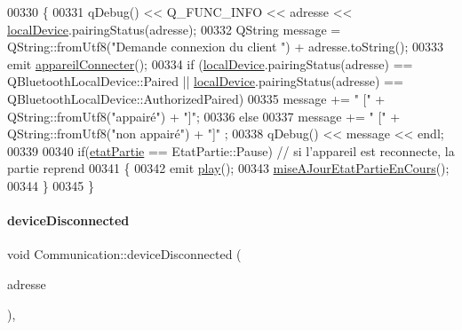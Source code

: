 \begin{DoxyCode}
00330 \{
00331     qDebug() << Q\_FUNC\_INFO << adresse << \hyperlink{class_communication_a6281796eab7523bef6be1a766e0e906f}{localDevice}.pairingStatus(adresse);
00332     QString message = QString::fromUtf8(\textcolor{stringliteral}{"Demande connexion du client "}) + adresse.toString();
00333     emit \hyperlink{class_communication_ae05ddbb1481cfb64f493940b6db8ed29}{appareilConnecter}();
00334     \textcolor{keywordflow}{if} (\hyperlink{class_communication_a6281796eab7523bef6be1a766e0e906f}{localDevice}.pairingStatus(adresse) == QBluetoothLocalDevice::Paired || 
      \hyperlink{class_communication_a6281796eab7523bef6be1a766e0e906f}{localDevice}.pairingStatus(adresse) == QBluetoothLocalDevice::AuthorizedPaired)
00335         message += \textcolor{stringliteral}{" ["} + QString::fromUtf8(\textcolor{stringliteral}{"appairé"}) + \textcolor{stringliteral}{"]"};
00336     \textcolor{keywordflow}{else}
00337         message += \textcolor{stringliteral}{" ["} + QString::fromUtf8(\textcolor{stringliteral}{"non appairé"}) + \textcolor{stringliteral}{"]"} ;
00338     qDebug() << message << endl;
00339 
00340     \textcolor{keywordflow}{if}(\hyperlink{class_communication_a2539ded2780db2c732690c585c768c96}{etatPartie} == EtatPartie::Pause) \textcolor{comment}{// si l'appareil est reconnecte, la partie reprend}
00341     \{
00342         emit \hyperlink{class_communication_a2645730b88adec069200debe05d212c3}{play}();
00343         \hyperlink{class_communication_a1f90de1ff5f98de887b9c77664e105c7}{miseAJourEtatPartieEnCours}();
00344     \}
00345 \}
\end{DoxyCode}
\mbox{\label{class_communication_a0ee021f517bb0e3f7149ed13f8faf0b1}} 
\paragraph{\texorpdfstring{device\+Disconnected}{deviceDisconnected}}
{\footnotesize\ttfamily void Communication\+::device\+Disconnected (\begin{DoxyParamCaption}\item[{const Q\+Bluetooth\+Address \&}]{adresse }\end{DoxyParamCaption})\hspace{0.3cm}{\ttfamily [private]}, {\ttfamily [slot]}}



